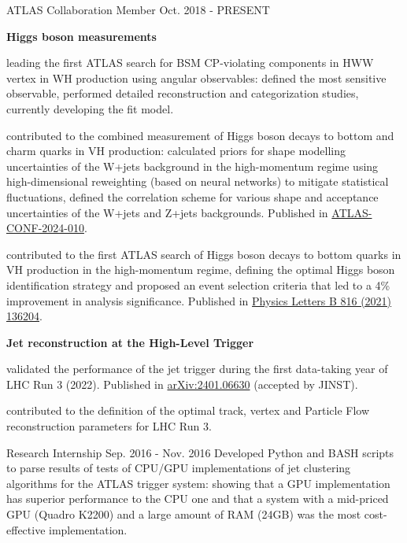 \begin{cventries}
    \cventry
    {ATLAS Collaboration}
    {Member}
    {}
    {Oct. 2018 - PRESENT}
    {
        \textbf{Higgs boson measurements}\vspace{14pt}
        \begin{cvitems}
            \item {leading the first ATLAS search for BSM CP-violating components in HWW vertex in WH production using angular observables: defined the most sensitive observable, performed detailed reconstruction and categorization studies, currently developing the fit model.}
            \item {contributed to the combined measurement of Higgs boson decays to bottom and charm quarks in VH production: calculated priors for shape modelling uncertainties of the W+jets background in the high-momentum regime using high-dimensional reweighting (based on neural networks) to mitigate statistical fluctuations, defined the correlation scheme for various shape and acceptance uncertainties of the W+jets and Z+jets backgrounds. Published in \href{https://cds.cern.ch/record/2905263}{ATLAS-CONF-2024-010}.}
            \item {contributed to the first ATLAS search of Higgs boson decays to bottom quarks in VH production in the high-momentum regime, defining the optimal Higgs boson identification strategy and proposed an event selection criteria that led to a 4\% improvement in analysis significance. Published in \href{https://doi.org/10.1016/j.physletb.2021.136204}{Physics Letters B 816 (2021) 136204}.}
        \end{cvitems}\vspace{19pt}
        \textbf{Jet reconstruction at the High-Level Trigger}\vspace{14pt}
        \begin{cvitems}
            \item {validated the performance of the jet trigger during the first data-taking year of LHC Run 3 (2022). Published in \href{https://doi.org/10.48550/arXiv.2401.06630}{arXiv:2401.06630} (accepted by JINST).}
            \item {contributed to the definition of the optimal track, vertex and Particle Flow reconstruction parameters for LHC Run 3.}
        \end{cvitems}
    }

    {Research Internship}
    {}
    {Sep. 2016 - Nov. 2016}
    {Developed Python and BASH scripts to parse results of tests of CPU/GPU implementations of jet clustering algorithms for the ATLAS trigger system: showing that a GPU implementation has superior performance to the CPU one and that a system with a mid-priced GPU (Quadro K2200) and a large amount of RAM (24GB) was the most cost-effective implementation.}


\end{cventries}
